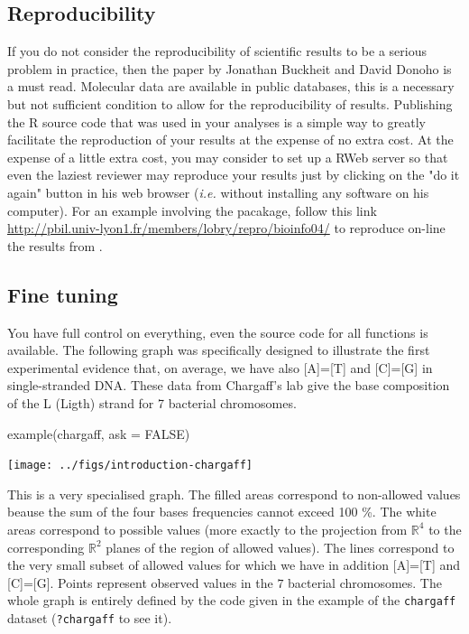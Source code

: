 \documentclass{article}
\begin{document}
\subsection{Reproducibility} 
If you do not consider the reproducibility of scientific results
to be a serious problem in practice, then the paper by Jonathan Buckheit and David Donoho
\cite{repro} is a must read. Molecular data are available in public databases, this is
a necessary but not sufficient condition to allow for the reproducibility of results.
Publishing the R source code that was used in your analyses is a simple way
to greatly facilitate the reproduction of your results at the expense of no extra cost. 
At the expense of a little extra cost, you may consider to set up a RWeb server
so that even the laziest reviewer may reproduce your results just by clicking on
the "do it again" button in his web browser (\textit{i.e.} without installing any
software on his computer). For an example involving the \seqinr{} pacakage, 
follow this link \url{http://pbil.univ-lyon1.fr/members/lobry/repro/bioinfo04/}
to reproduce on-line the results from \cite{fifine}.

\subsection{Fine tuning} 
You have full control on everything, even the source code
for all functions is available. 
The following graph was specifically designed to illustrate
the first experimental evidence \cite{chargaff} that, on average, we have also [A]=[T] and [C]=[G] 
in single-stranded DNA. These data from Chargaff's lab give the base composition of the L (Ligth) 
strand for 7 bacterial chromosomes.

\begin{Schunk}
\begin{Sinput}
 example(chargaff, ask = FALSE)
\end{Sinput}
\end{Schunk}
\texttt{[image: ../figs/introduction-chargaff]}

This is a very specialised graph. The filled areas correspond to non-allowed values beause the sum 
of the four bases frequencies cannot exceed 100 \%. The white areas correspond to possible values 
(more exactly to the projection from $\mathbb{R}^4$ to the corresponding $\mathbb{R}^2$ 
planes of the region of allowed values). The lines correspond to the very small subset of allowed 
values for which we have in addition [A]=[T] and [C]=[G]. Points represent observed values in
the $7$ bacterial chromosomes. The whole graph is entirely defined by the code given in the
example of the \texttt{chargaff} dataset (\texttt{?chargaff} to see it).
\end{document}
